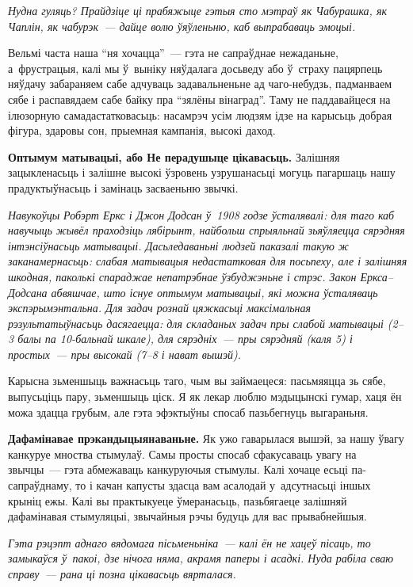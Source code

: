 \emph{Нудна гуляць? Прайдзіце ці прабяжыце гэтыя сто мэтраў як Чабурашка, як Чаплін, як чабурэк~--- дайце волю ўяўленьню, каб выпрабаваць эмоцыі.}

Вельмі часта наша ``ня хочацца''~--- гэта не сапраўднае нежаданьне, а~фрустрацыя, калі мы ў~выніку няўдалага досьведу або ў~страху пацярпець няўдачу забараняем сабе адчуваць задавальненьне ад чаго-небудзь, падманваем сябе і распавядаем сабе байку пра ``зялёны вінаград''. Таму не паддавайцеся на ілюзорную самадастатковасьць: насамрэч усім людзям ідзе на карысьць добрая фігура, здаровы сон, прыемная кампанія, высокі даход.

\textbf{Оптымум матывацыі, або Не перадушыце цікавасьць.} Залішняя зацыкленасьць і залішне высокі ўзровень узрушанасьці могуць пагаршаць нашу прадуктыўнасьць і замінаць засваеньню звычкі.

\emph{Навукоўцы Робэрт Еркс і Джон Додсан ў~1908 годзе ўсталявалі: для таго каб навучыць жывёл праходзіць лябірынт, найбольш спрыяльнай зьяўляецца сярэдняя інтэнсіўнасьць матывацыі. Дасьледаваньні людзей паказалі такую ж заканамернасьць: слабая матывацыя недастатковая для посьпеху, але і залішняя шкодная, паколькі спараджае непатрэбнае ўзбуджэньне і стрэс. Закон Еркса--Додсана абвяшчае, што існуе оптымум матывацыі, які можна ўсталяваць экспэрымэнтальна. Для задач рознай цяжкасьці максімальная рэзультатыўнасьць дасягаецца: для складаных задач пры слабой матывацыі (2--3 балы па 10-бальнай шкале), для сярэдніх~--- пры сярэдняй (каля 5) і простых~--- пры высокай (7--8 і нават вышэй).}


Карысна зьменшыць важнасьць таго, чым вы займаецеся: пасьмяяцца зь сябе, выпусьціць пару, зьменшыць ціск. Я як лекар люблю мэдыцынскі гумар, хаця ён можа здацца грубым, але гэта эфэктыўны спосаб пазьбегнуць выгараньня.

\textbf{Дафамінавае прэкандыцыянаваньне.} Як ужо гаварылася вышэй, за нашу ўвагу канкуруе мноства стымулаў. Самы просты спосаб сфакусаваць увагу на звычцы~--- гэта абмежаваць канкуруючыя стымулы. Калі хочаце есьці па-сапраўднаму, то і качан капусты здасца вам асалодай у~адсутнасьці іншых крыніц ежы. Калі вы практыкуеце ўмеранасьць, пазьбягаеце залішняй дафамінавая стымуляцыі, звычайныя рэчы будуць для вас прывабнейшыя.

\emph{Гэта рэцэпт аднаго вядомага пісьменьніка~--- калі ён не хацеў пісаць, то замыкаўся ў~пакоі, дзе нічога няма, акрамя паперы і асадкі. Нуда рабіла сваю справу~--- рана ці позна цікавасьць вярталася.}


